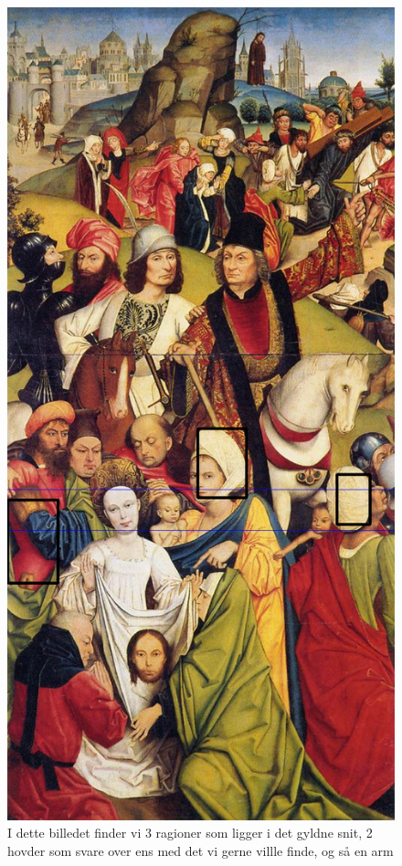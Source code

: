 \begin{figure}[h!!]
	\begin{center}
		\includegraphics[scale=0.35,angle=0]{afsnit/afprovning/billeder/BBCarruingcut2.png}
	\end{center}
	\caption[]{I dette billedet finder vi 3 ragioner som ligger i det
	           gyldne snit, 2 hovder som svare over ens med det vi gerne villle finde, og så en arm}
	\label{BBCarruingcut2}
\end{figure}


